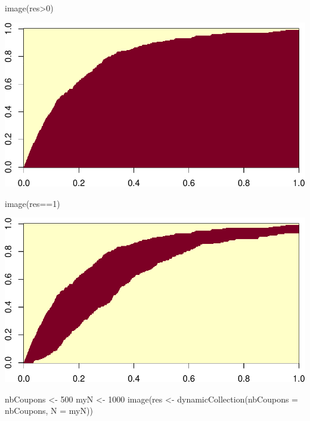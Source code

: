 \documentclass[
]{article}
\newenvironment{Shaded}{\begin{snugshade}}{\end{snugshade}}
\newcommand{\AttributeTok}[1]{\textcolor[rgb]{0.77,0.63,0.00}{#1}}
\newcommand{\DecValTok}[1]{\textcolor[rgb]{0.00,0.00,0.81}{#1}}
\newcommand{\FunctionTok}[1]{\textcolor[rgb]{0.00,0.00,0.00}{#1}}
\newcommand{\NormalTok}[1]{#1}
\newcommand{\OtherTok}[1]{\textcolor[rgb]{0.56,0.35,0.01}{#1}}
\newcommand{\SpecialCharTok}[1]{\textcolor[rgb]{0.00,0.00,0.00}{#1}}
\begin{document}
\begin{Shaded}
\begin{Highlighting}[]
\FunctionTok{image}\NormalTok{(res}\SpecialCharTok{\textgreater{}}\DecValTok{0}\NormalTok{)}
\end{Highlighting}
\end{Shaded}

\includegraphics{examples_files/figure-latex/unnamed-chunk-3-2.pdf}

\begin{Shaded}
\begin{Highlighting}[]
\FunctionTok{image}\NormalTok{(res}\SpecialCharTok{==}\DecValTok{1}\NormalTok{)}
\end{Highlighting}
\end{Shaded}

\includegraphics{examples_files/figure-latex/unnamed-chunk-3-3.pdf}

\begin{Shaded}
\begin{Highlighting}[]
\NormalTok{nbCoupons }\OtherTok{\textless{}{-}} \DecValTok{500}
\NormalTok{myN }\OtherTok{\textless{}{-}} \DecValTok{1000}
\FunctionTok{image}\NormalTok{(res }\OtherTok{\textless{}{-}} \FunctionTok{dynamicCollection}\NormalTok{(}\AttributeTok{nbCoupons =}\NormalTok{ nbCoupons, }\AttributeTok{N =}\NormalTok{ myN))}
\end{Highlighting}
\end{Shaded}
\end{document}
